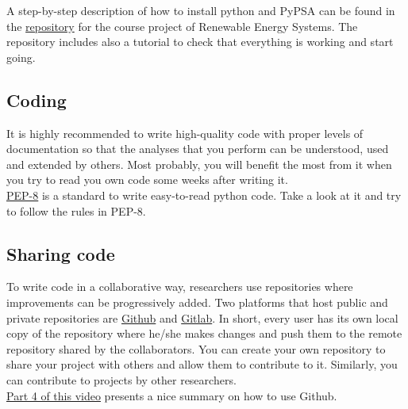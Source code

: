 \documentclass[3p]{elsarticle} %
\begin{document}
A step-by-step description of how to install python and PyPSA can be found in the \href{https://github.com/martavp/RES_project/blob/master/Instructions_RES_project.pdf}{repository} for the course project of Renewable Energy Systems. The repository includes also a tutorial to check that everything is working and start going. 

\subsection{Coding}

It is highly recommended to write high-quality code with proper levels of documentation so that the analyses that you perform can be understood, used and extended by others. Most probably, you will benefit the most from it when you try to read you own code some weeks after writing it. \\

\href{https://www.python.org/dev/peps/pep-0008/}{PEP-8} is a standard to write easy-to-read python code. Take a look at it and try to follow the rules in PEP-8.

\subsection{Sharing code}

To write code in a collaborative way, researchers use repositories where improvements can be progressively added. Two platforms that host public and private repositories are \href{https:\\github.com}{Github} and \href{https:\\gitlab.com}{Gitlab}. In short, every user has its own local copy of the repository where he/she makes changes and push them to the remote repository shared by the collaborators. You can create your own repository to share your project with others and allow them to contribute to it. Similarly, you can contribute to projects by other researchers.\\
\href{https://data.ene.iiasa.ac.at/teaching/osesm_2020_lecture_1_recording.html}{Part 4 of this video} presents a nice summary on how to use Github. 


\end{document}
